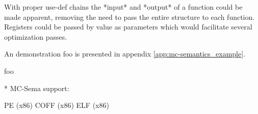 With proper use-def chains the *input* and *output* of a function could be made apparent, removing the need to pass the entire structure to each function. Registers could be passed by value as parameters which would facilitate several optimization passes.





An demonstration foo is presented in appendix \ref{app:mc-semantics_example}.

foo \cite{mcsema}

* MC-Sema support:

PE (x86)
COFF (x86)
ELF (x86)
